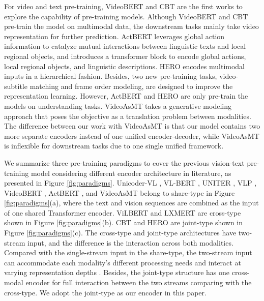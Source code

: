 \documentclass[11pt,a4paper]{article}
\begin{document}
	For video and text pre-training, VideoBERT \cite{sun2019videobert} and CBT \cite{sun2019contrastive} are the first works to explore the capability of pre-training models. Although VideoBERT and CBT pre-train the model on multimodal data, the downstream tasks mainly take video representation for further prediction. ActBERT \cite{Zhu_2020_CVPR} leverages global action information to catalyze mutual interactions between linguistic texts and local regional objects, and introduces a  transformer block to encode global actions, local regional objects, and linguistic descriptions. HERO \cite{Li2020HERO} encodes multimodal inputs in a hierarchical fashion. Besides, two new pre-training tasks, video-subtitle matching and frame order modeling, are designed to improve the representation learning. However, ActBERT and HERO are only pre-train the models on understanding tasks. VideoAsMT \cite{Korbar2020} takes a generative modeling approach that poses the objective as a translation problem between modalities. The difference between our work with VideoAsMT is that our model contains two more separate encoders instead of one unified encoder-decoder, while VideoAsMT is inflexible for downstream tasks due to one single unified framework. 
	
	We summarize three pre-training paradigms to cover the previous vision-text pre-training model considering different encoder architecture in literature, as presented in Figure \ref{fig:paradigms}. Unicoder-VL \cite{li2019unicoder}, VL-BERT \cite{Su2020VLBERT}, UNITER \cite{zhou2019unified}, VLP \cite{zhou2019unified}, VideoBERT \cite{sun2019videobert}, ActBERT \cite{Zhu_2020_CVPR}, and VideoAsMT \cite{Korbar2020} belong to share-type in Figure \ref{fig:paradigms}(a), where the text and vision sequences are combined as the input of one shared Transformer encoder. ViLBERT \cite{lu2019vilbert} and LXMERT \cite{tan2019lxmert} are cross-type shown in Figure \ref{fig:paradigms}(b). CBT \cite{sun2019contrastive} and HERO \cite{Li2020HERO} are joint-type shown in Figure \ref{fig:paradigms}(c). The cross-type and joint-type architectures have two-stream input, and the difference is the interaction across both modalities. Compared with the single-stream input in the share-type, the two-stream input can accommodate each modality's different processing needs and interact at varying representation depths \cite{lu2019vilbert}. Besides, the joint-type structure has one cross-modal encoder for full interaction between the two streams comparing with the cross-type. We adopt the joint-type as our encoder in this paper.
	
\end{document}
